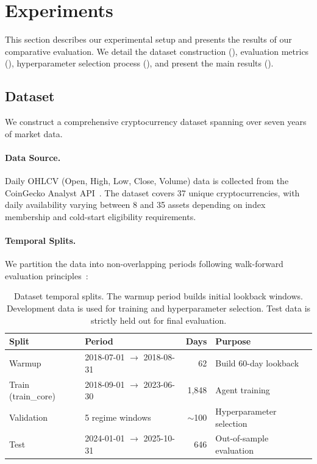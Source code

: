 
\section{Experiments}
\label{sec:experiments}

This section describes our experimental setup and presents the results of our comparative evaluation. We detail the dataset construction (), evaluation metrics (), hyperparameter selection process (), and present the main results ().

\subsection{Dataset}
\label{sec:dataset}

We construct a comprehensive cryptocurrency dataset spanning over seven years of market data.

\paragraph{Data Source.} Daily OHLCV (Open, High, Low, Close, Volume) data is collected from the CoinGecko Analyst API~\citep{coingecko2025}. The dataset covers 37 unique cryptocurrencies, with daily availability varying between 8 and 35 assets depending on index membership and cold-start eligibility requirements.

\paragraph{Temporal Splits.} We partition the data into non-overlapping periods following walk-forward evaluation principles~\citep{lucarelli2020dqlcrypto}:

\begin{table}[htbp]
\centering
\caption{Dataset temporal splits. The warmup period builds initial lookback windows. Development data is used for training and hyperparameter selection. Test data is strictly held out for final evaluation.}
\label{tab:splits}
\begin{tabular}{llrl}
\toprule
\textbf{Split} & \textbf{Period} & \textbf{Days} & \textbf{Purpose} \\
\midrule
Warmup & 2018-07-01 $\rightarrow$ 2018-08-31 & 62 & Build 60-day lookback \\
Train (train\_core) & 2018-09-01 $\rightarrow$ 2023-06-30 & 1,848 & Agent training \\
Validation & 5 regime windows & ${\sim}$100 & Hyperparameter selection \\
Test & 2024-01-01 $\rightarrow$ 2025-10-31 & 646 & Out-of-sample evaluation \\
\bottomrule
\end{tabular}
\end{table}

